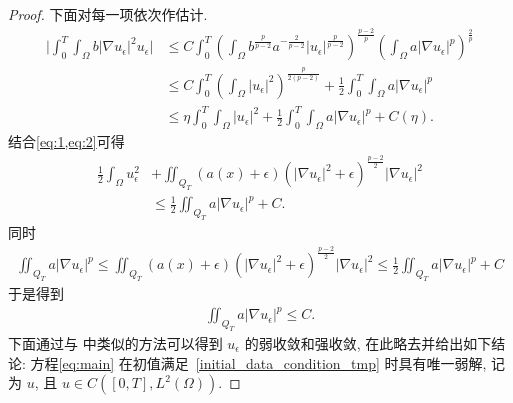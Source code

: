 \documentclass[oneside,longtitle]{LZUthesis}
\numberwithin{equation}{chapter}
\newcommand*\abs[1]{\lvert#1\rvert}
\begin{document}
\begin{proof}
	下面对每一项依次作估计.
	\begin{equation}\label{eq:2}
		\begin{split}
			\abs{\int_0^T\int_{\Omega} b\abs{\nabla u_{\epsilon}}^2u_{\epsilon}}
			&\leq C\int_0^T\left( \int_{\Omega} b^{\frac{p}{p-2}}a^{-\frac{2}{p-2}}\abs{u_{\epsilon}}^{\frac{p}{p-2}} \right)^{\frac{p-2}{p}}
			\left(  \int_{\Omega} a\abs{\nabla u_{\epsilon}}^p \right)^{\frac{2}{p}}\\
			&\leq C\int_0^T\left(\int_{\Omega}\abs{u_{\epsilon}}^2\right)^{\frac{p}{2(p-2)}} + \frac{1}{2}\int_0^T\int_{\Omega} a\abs{\nabla u_{\epsilon}}^p\\
			&\leq \eta\int_0^T\int_{\Omega}\abs{u_{\epsilon}}^2 + \frac{1}{2}\int_0^T\int_{\Omega} a\abs{\nabla u_{\epsilon}}^p + C(\eta).
		\end{split}
	\end{equation}
	结合\cref{eq:1,eq:2}可得
	\begin{equation*}
		\begin{split}
			\frac{1}{2} \int_{\Omega} u_{\epsilon}^{2}
			&+\iint_{Q_{T}}(a(x)+\epsilon)\left(\left|\nabla u_{\epsilon}\right|^{2}+\epsilon\right)^{\frac{p-2}{2}}\left|\nabla u_{\epsilon}\right|^{2}\\
			&\leq \frac{1}{2}\iint_{Q_T}a\abs{\nabla u_\epsilon}^p + C.
		\end{split}
	\end{equation*}
	同时
	\begin{equation*}
		\begin{split}
			\iint_{Q_T}a\abs{\nabla u_\epsilon}^p
			\leq \iint_{Q_{T}}(a(x)+\epsilon)\left(\left|\nabla u_{\epsilon}\right|^{2}+\epsilon\right)^{\frac{p-2}{2}}\left|\nabla u_{\epsilon}\right|^{2}
			\leq \frac{1}{2}\iint_{Q_T}a\abs{\nabla u_\epsilon}^p + C
		\end{split}
	\end{equation*}
	于是得到
	\begin{equation}\label{eq:iint_adu}
		\begin{split}
			\iint_{Q_T}a\abs{\nabla u_\epsilon}^p \leq C.
		\end{split}
	\end{equation}
	下面通过与 \cite{Zhan2019Uniquenessa} 中类似的方法可以得到 $u_\epsilon$ 的弱收敛和强收敛,
	在此略去并给出如下结论:
	方程\eqref{eq:main} 在初值满足~\eqref{initial_data_condition_tmp} 时具有唯一弱解, 记为 $u$,
	且 $u \in C([0, T], L^2(\Omega))$.


\end{proof}
\end{document}
